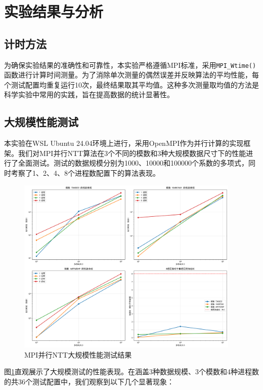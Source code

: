\documentclass[a4paper]{article}
\begin{document}
\section{实验结果与分析}

\subsection{计时方法}

为确保实验结果的准确性和可靠性，本实验严格遵循MPI标准，采用\texttt{MPI\_Wtime()}函数进行计算时间测量。为了消除单次测量的偶然误差并反映算法的平均性能，每个测试配置均重复运行10次，最终结果取其平均值。这种多次测量取均值的方法是科学实验中常用的实践，旨在提高数据的统计显著性。

\subsection{大规模性能测试}

本实验在WSL Ubuntu 24.04环境上进行，采用OpenMPI作为并行计算的实现框架。我们对MPI并行NTT算法在3个不同的模数和3种大规模数据尺寸下的性能进行了全面测试。测试的数据规模分别为1000、10000和100000个系数的多项式，同时考察了1、2、4、8个进程数配置下的算法表现。

\begin{figure}[H]
    \centering
    \includegraphics[width=0.95\textwidth]{fig/mpi_performance.png}
    \caption{MPI并行NTT大规模性能测试结果}
    \label{fig:mpi_performance}
\end{figure}

图\ref{fig:mpi_performance}直观展示了大规模测试的性能表现。在涵盖3种数据规模、3个模数和4种进程数的共36个测试配置中，我们观察到以下几个显著现象：
\end{document}
